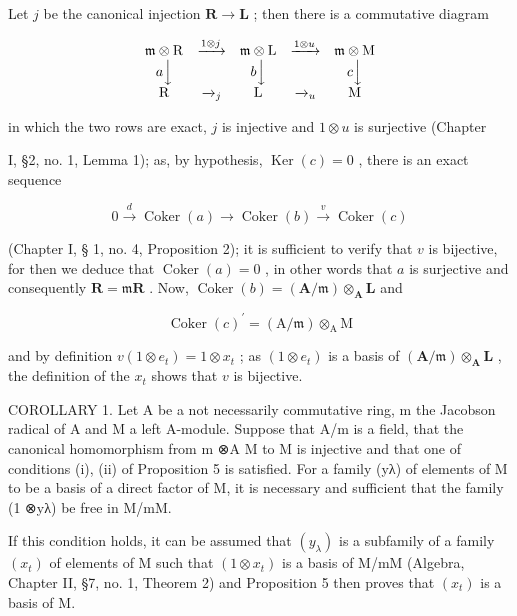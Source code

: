 Let \(j\) be the canonical injection \(\mathbf{R} \to \mathbf{L}\) ; then there is a commutative diagram

\[
\begin{array}{c c c c c} \mathfrak {m} \otimes \mathrm{R} & \xrightarrow {1 \otimes j} & \mathfrak {m} \otimes \mathrm{L} & \xrightarrow {1 \otimes u} & \mathfrak {m} \otimes \mathrm{M} \\ a \Big \downarrow & & b \Big \downarrow & & c \Big \downarrow \\ \mathrm{R} & \xrightarrow {} _ {j} & \mathrm{L} & \xrightarrow {} _ {u} & \mathrm{M} \end{array}
\]

in which the two rows are exact, \(j\) is injective and \(1 \otimes u\) is surjective (Chapter

I, §2, no. 1, Lemma 1); as, by hypothesis, \(\operatorname{Ker}(c) = 0\) , there is an exact sequence

\[
0 \xrightarrow {d} \operatorname{Coker} (a) \longrightarrow \operatorname{Coker} (b) \xrightarrow {v} \operatorname{Coker} (c)
\]

(Chapter I, § 1, no. 4, Proposition 2); it is sufficient to verify that \(v\) is bijective, for then we deduce that \(\operatorname{Coker}(a) = 0\) , in other words that \(a\) is surjective and consequently \(\mathbf{R} = \mathfrak{m}\mathbf{R}\) . Now, \(\operatorname{Coker}(b) = (\mathbf{A}/\mathfrak{m}) \otimes_{\mathbf{A}} \mathbf{L}\) and

\[
\operatorname{Coker} (c) ^{\prime} = (\mathrm{A} / \mathfrak {m}) \otimes_ {\mathrm{A}} \mathrm{M}
\]

and by definition \(v(1 \otimes e_t) = 1 \otimes x_t\) ; as \((1 \otimes e_t)\) is a basis of \((\mathbf{A} / \mathfrak{m}) \otimes_{\mathbf{A}} \mathbf{L}\) , the definition of the \(x_t\) shows that \(v\) is bijective.

COROLLARY 1. Let A be a not necessarily commutative ring, m the Jacobson radical of A and M a left A-module. Suppose that A/m is a field, that the canonical homomorphism from m ⊗A M to M is injective and that one of conditions (i), (ii) of Proposition 5 is satisfied. For a family (yλ) of elements of M to be a basis of a direct factor of M, it is necessary and sufficient that the family (1 ⊗yλ) be free in M/mM.

If this condition holds, it can be assumed that \((y_{\lambda})\) is a subfamily of a family \((x_{t})\) of elements of M such that \((1 \otimes x_{t})\) is a basis of M/mM (Algebra, Chapter II, §7, no. 1, Theorem 2) and Proposition 5 then proves that \((x_{t})\) is a basis of M.

